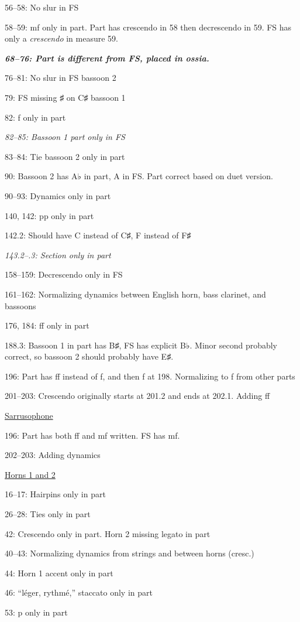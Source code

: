 \documentclass[twoside]{article}
\begin{document}
\begin{hangparas}{15pt}{1}
\begin{multicols}{2}
56--58: No slur in FS

58--59: mf only in part. Part has crescendo in 58 then decrescendo in 59. FS has only a \textit{crescendo} in measure 59.

\textbf{\textit{68--76: Part is different from FS, placed in ossia.}}

76--81: No slur in FS bassoon 2

79: FS missing ♯ on C♯ bassoon 1

82: f only in part

\textit{82--85: Bassoon 1 part only in FS}

83--84: Tie bassoon 2 only in part

90: Bassoon 2 has A♭ in part, A in FS. Part correct based on duet version.

90--93: Dynamics only in part

140, 142: pp only in part

142.2: Should have C instead of C♯, F instead of F♯

\textit{143.2--.3: Section only in part}

158--159: Decrescendo only in FS

161--162: Normalizing dynamics between English horn, bass clarinet, and bassoons

176, 184: ff only in part

188.3: Bassoon 1 in part has B♯, FS has explicit B♭. Minor second probably correct, so bassoon 2 should probably have E♯.

196: Part has ff instead of f, and then f at 198. Normalizing to f from other parts

201--203: Crescendo originally starts at 201.2 and ends at 202.1. Adding ff

\underline{Sarrusophone}

196: Part has both ff and mf written. FS has mf.

202--203: Adding dynamics

\underline{Horns 1 and 2}

16--17: Hairpins only in part

26--28: Ties only in part

42: Crescendo only in part. Horn 2 missing legato in part

40--43: Normalizing dynamics from strings and between horns (cresc.)

44: Horn 1 accent only in part

46: ``léger, rythmé,'' staccato only in part

53: p only in part


\end{multicols}
\end{hangparas}
\end{document}
